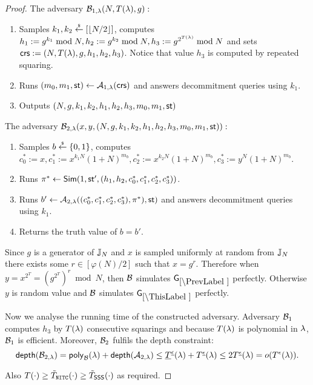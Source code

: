 \begin{proof}
The adversary $\mathcal{B}_{1,\lambda}(N, T(\lambda), g):$
\vspace{-2mm}
\begin{enumerate}
\item Samples $k_1, k_2 \stackrel{{\scriptscriptstyle\$}}{\leftarrow} [\left\lfloor N/2 \right\rfloor]$, computes $h_1 := g^{k_1} \bmod N, h_2 := g^{k_2} \bmod N,  h_3 := g^{2^{T(\lambda)}} \bmod N$ and sets $\mathsf{crs}:=(N, T(\lambda), g, h_1, h_2, h_3)$. Notice that value $h_3$ is computed by repeated squaring.
\item Runs $(m_0, m_1, \mathsf{st}) \leftarrow \mathcal{A}_{1, \lambda}(\mathsf{crs})$ and answers decommitment queries using $k_1$.
\item Outputs $(N,g,k_1, k_2, h_1,h_2,h_3, m_0, m_1, \mathsf{st})$
\end{enumerate}

The adversary $\mathcal{B}_{2,\lambda}(x,y,(N,g,k_1, k_2, h_1,h_2,h_3, m_0, m_1, \mathsf{st})):$
\vspace{-2mm}
\begin{enumerate}
\item Samples $b \stackrel{{\scriptscriptstyle\$}}{\leftarrow} \{0,1\}$, computes $c_0^*:=x, c_1^*:=x^{k_1N}(1+N)^{m_b}, c_2^*:=x^{k_2N}(1+N)^{m_b}, c_3^*:=y^{N}(1+N)^{m_b}$.
\item Runs $\pi^* \leftarrow \mathsf{Sim}(1, \mathsf{st}', (h_1, h_2, c_0^*, c_1^*, c_2^*, c_3^*))$.
\item Runs $b' \leftarrow \mathcal{A}_{2, \lambda}((c_0^*, c_1^*, c_2^*, c_3^*), \pi^*), \mathsf{st})$ and answers decommitment queries using $k_1$.
\item Returns the truth value of $b=b'$.
\end{enumerate}
Since $g$ is a generator of $\mathbb{J}_N$ and $x$ is sampled uniformly at random from $\mathbb{J}_N$ there exists some $r \in [\varphi(N)/2]$ such that $x = g^{r}$. Therefore when $y = x^{2^T} = (g^{2^T})^{r} \bmod N$, then $\mathcal{B}$ simulates $\games_\prevgame$ perfectly. Otherwise $y$ is random value and $\mathcal{B}$ simulates $\games_\thisgame$ perfectly. 

Now we analyse the running time of the constructed adversary. Adversary $\mathcal{B}_1$ computes $h_3$ by $T(\lambda)$ consecutive squarings and because $T(\lambda)$ is polynomial in $\lambda$, $\mathcal{B}_1$ is efficient. Moreover, $\mathcal{B}_2$ fulfils the depth constraint:
\[ \mathsf{depth}(\mathcal{B}_{2,\lambda}) = \mathsf{poly}_{\mathcal{B}}(\lambda) + \mathsf{depth}(\mathcal{A}_{2,\lambda}) \leq \underline{T}^{\underline{\epsilon}}(\lambda) + T^{\underline{\epsilon}}(\lambda) \leq 2 T^{\underline{\epsilon}}(\lambda) = o(T^{\epsilon}(\lambda)). \] 

Also $T(\cdot) \geq \tilde{T}_{\mathtt{NITC}}(\cdot) \geq \tilde{T}_\mathsf{SSS}(\cdot)$ as required.

%





\end{proof}

